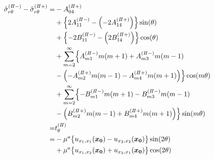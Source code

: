 \begin{align}
	\hat{\sigma}_{r\theta}^{(I\hspace{-.15em}I-)}-\hat{\sigma}_{r\theta}^{(I\hspace{-.15em}I+)} =
	&-A_{04}^{(I\hspace{-.15em}I+)}
	\nonumber
	\\
	&+\Bigl\{2A_{11}^{(I\hspace{-.15em}I-)}
	-\Bigl(-2A_{14}^{(I\hspace{-.15em}I+)}\Bigr)\Bigr\}\sin(\theta)
	\nonumber
	\\
	&+\Bigl\{-2B_{11}^{(I\hspace{-.15em}I-)}
	-\Bigl(2B_{14}^{(I\hspace{-.15em}I+)}\Bigr)\Bigr\}\cos(\theta)
	\nonumber
	\\
	&+\sum_{m=2}^{\infty}\Bigl\{
 	A_{m1}^{(I\hspace{-.15em}I-)}m(m+1)+A_{m3}^{(I\hspace{-.15em}I-)}m(m-1)
	\nonumber
	\\
	&-\Bigl(-A_{m2}^{(I\hspace{-.15em}I+)}m(m-1)-A_{m4}^{(I\hspace{-.15em}I+)}m(m+1)\Bigr)
	\Bigr\}\cos(m\theta)
	\nonumber
	\\
	&+\sum_{m=2}^{\infty}\Bigl\{
	-B_{m1}^{(I\hspace{-.15em}I-)}m(m+1)-B_{m3}^{(I\hspace{-.15em}I-)}m(m-1)
	\nonumber
	\\
	&-\Bigl(B_{m2}^{(I\hspace{-.15em}I+)}m(m-1)+B_{m4}^{(I\hspace{-.15em}I+)}m(m+1)\Bigr)
	\Bigr\}\sin(m\theta)
	\nonumber
	\\
	=&t_{\theta}^{(I\hspace{-.15em}I)}
	\nonumber
	\\
		=&-\mu^a \bigl\{u_{x_{1},x_{1}}(\bm{x_{0}})-u_{x_{2},x_{2}}(\bm{x_{0}})\bigr\}\sin(2\theta)
			\nonumber
			\\
			&+\mu^a \bigl\{u_{x_{1},x_{2}}(\bm{x_{0}})+u_{x_{2},x_{1}}(\bm{x_{0}})\bigr\}\cos(2\theta)
	\label{eq:SigmaRTh2eq}
\end{align}
